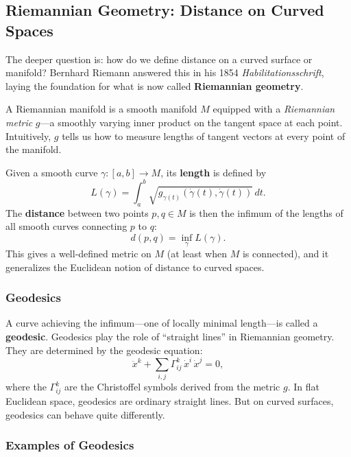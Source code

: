 \subsection{Riemannian Geometry: Distance on Curved Spaces}

The deeper question is: how do we define distance on a curved surface or manifold? Bernhard Riemann answered this in his 1854 \emph{Habilitationsschrift}, laying the foundation for what is now called \textbf{Riemannian geometry}.

A Riemannian manifold is a smooth manifold $M$ equipped with a \emph{Riemannian metric} $g$---a smoothly varying inner product on the tangent space at each point. Intuitively, $g$ tells us how to measure lengths of tangent vectors at every point of the manifold.

Given a smooth curve $\gamma : [a,b] \to M$, its \textbf{length} is defined by
\[
    L(\gamma) = \int_a^b \sqrt{g_{\gamma(t)}(\dot\gamma(t), \dot\gamma(t))} \, dt.
\]
The \textbf{distance} between two points $p, q \in M$ is then the infimum of the lengths of all smooth curves connecting $p$ to $q$:
\[
    d(p,q) = \inf_{\gamma} L(\gamma).
\]
This gives a well-defined metric on $M$ (at least when $M$ is connected), and it generalizes the Euclidean notion of distance to curved spaces.

\subsubsection*{Geodesics}

A curve achieving the infimum---one of locally minimal length---is called a \textbf{geodesic}. Geodesics play the role of ``straight lines'' in Riemannian geometry. They are determined by the geodesic equation:
\[
    \ddot{x}^k + \sum_{i,j} \Gamma^k_{ij} \, \dot{x}^i \, \dot{x}^j = 0,
\]
where the $\Gamma^k_{ij}$ are the Christoffel symbols derived from the metric $g$. In flat Euclidean space, geodesics are ordinary straight lines. But on curved surfaces, geodesics can behave quite differently.

\subsubsection*{Examples of Geodesics}

